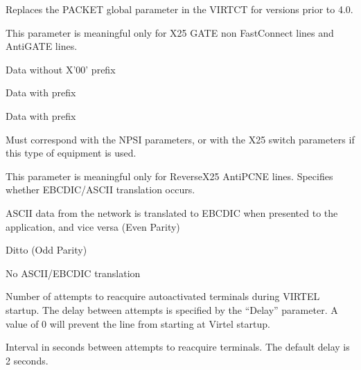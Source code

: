 \documentclass[letterpaper,10pt,english]{sphinxmanual}
\begin{document}
\begin{description}
\sphinxAtStartPar
Replaces the PACKET global parameter in the VIRTCT for versions
prior to 4.0.

\sphinxAtStartPar
This parameter is meaningful only for X25 GATE non Fast\sphinxhyphen{}Connect
lines and AntiGATE lines.
\begin{description}
\sphinxAtStartPar
Data without X’00’ prefix

\sphinxAtStartPar
Data with prefix

\sphinxAtStartPar
Data with prefix

\end{description}

\sphinxAtStartPar
Must correspond with the NPSI parameters, or with the X25 switch
parameters if this type of equipment is used.

\sphinxAtStartPar
This parameter is meaningful only for Reverse\sphinxhyphen{}X25 AntiPCNE lines.
Specifies whether EBCDIC/ASCII translation occurs.
\begin{description}
\sphinxAtStartPar
ASCII data from the network is translated to EBCDIC when presented
to the application, and vice versa (Even Parity)

\sphinxAtStartPar
Ditto (Odd Parity)

\sphinxAtStartPar
No ASCII/EBCDIC translation

\end{description}

\sphinxAtStartPar
Number of attempts to reacquire auto\sphinxhyphen{}activated terminals during
VIRTEL startup. The delay between attempts is specified by the
“Delay” parameter. A value of 0 will prevent the line from
starting at Virtel startup.

\sphinxAtStartPar
Interval in seconds between attempts to reacquire terminals. The
default delay is 2 seconds.

\end{description}

\newpage

\ignorespaces 
\end{document}

